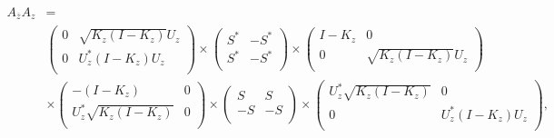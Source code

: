 \documentclass{amsart}
\begin{document}
\begin{align*}
A_{\overline{z}}A_{z} &= \\
& \left(
                                       \begin{array}{cc}
                                        0 & \sqrt{K_{z}(I- K_{z})}U_{z} \\
                                        0 & U^{*}_{z}(I-K_z)U_{z} \\
                                       \end{array}
                                     \right) \times
                                    \left(
                                     \begin{array}{cc}
                                          S^{*} & -S^{*} \\
                                          S^{*} & -S^{*} \\
                                        \end{array}
                                      \right) \times
                                     \left(
                                        \begin{array}{cc}
                                          I- K_z & 0 \\
                                          0 & \sqrt{K_{z}(I - K_z)}U_z \\
                                        \end{array}
                                      \right)\\
&\times  \left(
                                       \begin{array}{cc}
                                        - (I-K_z) & 0 \\
                                         U^{*}_{z}\sqrt{K_{z}(I-K_{z})} & 0 \\
                                       \end{array}
                                     \right) \times
                                     \left(
                                       \begin{array}{cc}
                                         S & S \\
                                         -S & -S \\
                                       \end{array}
                                     \right)\times
                                     \left(
                                       \begin{array}{cc}
                                         U^{*}_{z}\sqrt{K_{z}(I-K_{z})} & 0 \\
                                         0 & U^{*}_{z}(I- K_{z})U_z \\
                                       \end{array}
                                     \right),
\end{align*}
\end{document}
